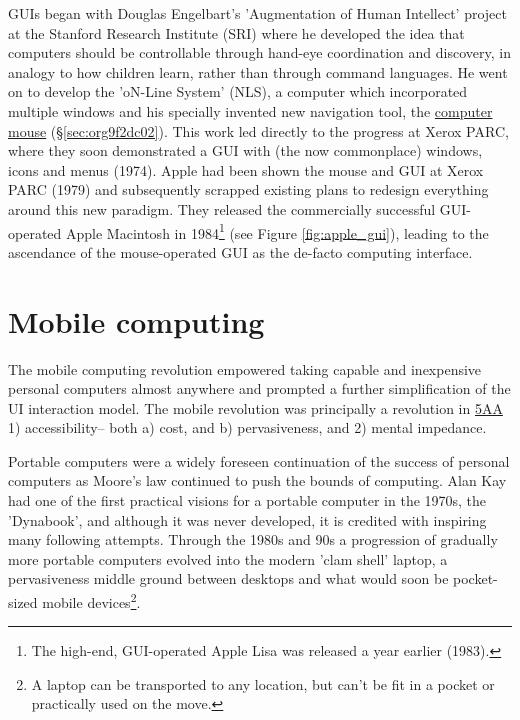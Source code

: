 \documentclass[logo,bsc,singlespacing,parskip]{infthesis}
\begin{document}
GUIs began with Douglas Engelbart's 'Augmentation of Human Intellect' project at the Stanford Research Institute (SRI) where he developed the idea that computers should be controllable through hand-eye coordination and discovery, in analogy to how children learn, rather than through command languages.
He went on to develop the 'oN-Line System' (NLS), a computer which incorporated multiple windows and his specially invented new navigation tool, the \hyperref[sec:org9f2dc02]{computer mouse} (\S \ref{sec:org9f2dc02}).
This work led directly to the progress at Xerox PARC, where they soon demonstrated a GUI with (the now commonplace) windows, icons and menus (1974).
Apple had been shown the mouse and GUI at Xerox PARC (1979) and subsequently scrapped existing plans to redesign everything around this new paradigm.
They released the commercially successful GUI-operated Apple Macintosh in 1984\footnote{The high-end, GUI-operated Apple Lisa was released a year earlier (1983).} (see Figure \ref{fig:apple_gui}),  leading to the ascendance of the mouse-operated GUI as the de-facto computing interface.

\section{Mobile computing}
\label{sec:org0d3bcff}
The mobile computing revolution empowered taking capable and inexpensive personal computers almost anywhere and prompted a further simplification of the UI interaction model.
The mobile revolution was principally a revolution in \hyperref[org2644eb5]{5AA} 1) accessibility-- both a) cost, and b) pervasiveness, and 2) mental impedance.

Portable computers were a widely foreseen continuation of the success of personal computers as Moore's law continued to push the bounds of computing.
Alan Kay had one of the first practical visions for a portable computer in the 1970s, the 'Dynabook', and although it was never developed, it is credited with inspiring many following attempts.
Through the 1980s and 90s a progression of gradually more portable computers evolved into the modern 'clam shell' laptop, a pervasiveness middle ground between desktops and what would soon be pocket-sized mobile devices\footnote{A laptop can be transported to any location, but can't be fit in a pocket or practically used on the move.}.
\end{document}
